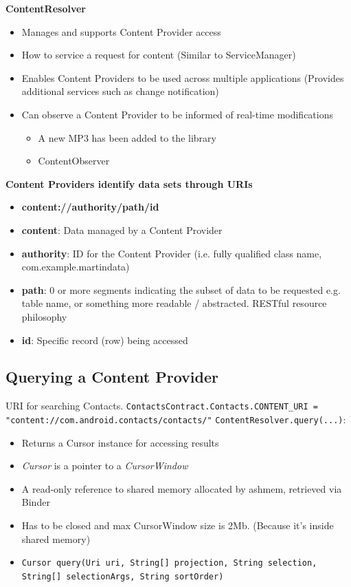 \documentclass{article}
\begin{document}
\begin{flushleft}
\textbf{ContentResolver}
\begin{itemize}
  \item Manages and supports Content Provider access 
  \item How to service a request for content (Similar to ServiceManager) 
  \item Enables Content Providers to be used across multiple applications (Provides additional services such as change notification)
  \item Can observe a Content Provider to be informed of real-time modifications
  \begin{itemize}
    \item A new MP3 has been added to the library 
    \item ContentObserver
  \end{itemize}
\end{itemize}
\textbf{Content Providers identify data sets through URIs}
\begin{itemize}
  \item \textbf{content://authority/path/id} 
  \item \textbf{content}: Data managed by a Content Provider 
  \item \textbf{authority}: ID for the Content Provider (i.e. fully qualified class name, com.example.martindata) 
  \item \textbf{path}: 0 or more segments indicating the subset of data to be requested e.g. table name, or something more readable / abstracted. RESTful resource philosophy 
  \item \textbf{id}: Specific record (row) being accessed
\end{itemize}
\end{flushleft}

\pagebreak

\subsection{Querying a Content Provider}
  
\begin{flushleft}
URI for searching Contacts. \verb|ContactsContract.Contacts.CONTENT_URI = "content://com.android.contacts/contacts/"|
\verb|ContentResolver.query(...)|:
\begin{itemize}
  \item Returns a Cursor instance for accessing results 
  \item \textit{Cursor} is a pointer to a \textit{CursorWindow} 
  \item A read-only reference to shared memory allocated by ashmem, retrieved via Binder 
  \item Has to be closed and max CursorWindow size is 2Mb. (Because it's inside shared memory)
  \item \verb|Cursor query(Uri uri, String[] projection, String selection, String[] selectionArgs, String sortOrder)|
\end{itemize}
\end{flushleft}
\end{document}
